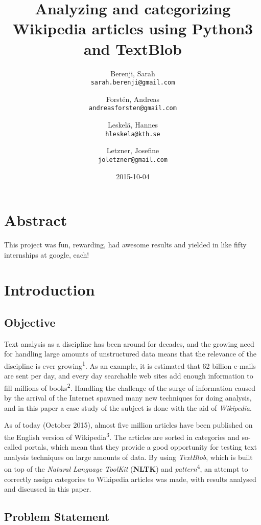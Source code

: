 \documentclass[a4paper]{article}
\title{Analyzing and categorizing Wikipedia articles using Python3 and TextBlob}
\author{
  Berenji, Sarah\\
  \texttt{sarah.berenji@gmail.com}
  \and
  Forstén, Andreas\\
  \texttt{andreasforsten@gmail.com}
  \and
  Leskelä, Hannes\\
  \texttt{hleskela@kth.se}
  \and
  Letzner, Josefine\\
    \texttt{joletzner@gmail.com}
}
\date{2015-10-04}
\begin{document}
\maketitle
\section*{Abstract}
This project was fun, rewarding, had awesome results and yielded in like fifty internships at google, each!
\newpage
\tableofcontents
\newpage

\section{Introduction}


\vspace{3mm}

\subsection{Objective}

Text analysis as a discipline has been around for decades, and the growing need for handling large amounts of unstructured data means that the relevance of the discipline is ever growing\textsuperscript{1}. As an example, it is estimated that 62 billion e-mails are sent per day, and every day searchable web sites add enough information to fill millions of books\textsuperscript{2}.  Handling the challenge of the surge of information caused by the arrival of the Internet spawned many new techniques for doing analysis, and in this paper a case study of the subject is done with the aid of \textit{Wikipedia}. 

\vspace{3mm}

As of today (October 2015), almost five million articles have been published on the English version of Wikipedia\textsuperscript{3}. The articles are sorted in categories and so-called portals, which mean that they provide a good opportunity for testing text analysis techniques on large amounts of data. By using \textit{TextBlob}, which is built on top of the \textit{Natural Language ToolKit} (\textbf{NLTK}) and \textit{pattern}\textsuperscript{4}, an attempt to correctly assign categories to Wikipedia articles was made, with results analysed and discussed in this paper. 

\vspace{3mm}

\subsection{Problem Statement}
\end{document}
